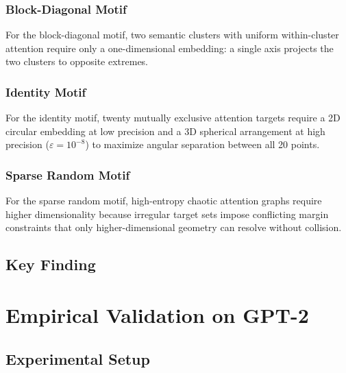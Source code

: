 \subsubsection{Block-Diagonal Motif}
For the block-diagonal motif, two semantic clusters with uniform within-cluster attention
require only a one-dimensional embedding: a single axis projects the two clusters to
opposite extremes.

\subsubsection{Identity Motif}
For the identity motif, twenty mutually exclusive attention targets require a 2D circular
embedding at low precision and a 3D spherical arrangement at high precision ($\varepsilon =
10^{-8}$) to maximize angular separation between all 20 points.

\subsubsection{Sparse Random Motif}
For the sparse random motif, high-entropy chaotic attention graphs require higher
dimensionality because irregular target sets impose conflicting margin constraints that only
higher-dimensional geometry can resolve without collision.

\subsection{Key Finding}

\begin{center}
\end{center}

\section{Empirical Validation on GPT-2}
\label{sec:gpt2}

\subsection{Experimental Setup}

